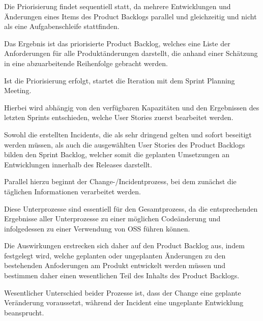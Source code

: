 Die Priorisierung findet sequentiell statt, da mehrere Entwicklungen und Änderungen eines Items des Product Backlogs parallel und gleichzeitig und nicht als eine Aufgabenschleife stattfinden. 

Das Ergebnis ist das priorisierte Product Backlog, welches eine Liste der Anforderungen für alle Produktänderungen darstellt, die anhand einer Schätzung in eine abzuarbeitende Reihenfolge gebracht werden.

Ist die Priorisierung erfolgt, startet die Iteration mit dem Sprint Planning Meeting. 

Hierbei wird abhängig von den verfügbaren Kapazitäten und den Ergebnissen des letzten Sprints entschieden, welche User Stories zuerst bearbeitet werden. 

Sowohl die erstellten Incidents, die als sehr dringend gelten und sofort beseitigt werden müssen, als auch die ausgewählten User Stories des Product Backlogs bilden den Sprint Backlog, welcher somit die geplanten Umsetzungen an Entwicklungen innerhalb des Releases darstellt.

Parallel hierzu beginnt der Change-/Incidentprozess, bei dem zunächst die täglichen Informationen verarbeitet werden. 

Diese Unterprozesse sind essentiell für den Gesamtprozess, da die entsprechenden Ergebnisse aller Unterprozesse zu einer möglichen Codeänderung und infolgedessen zu einer Verwendung von OSS führen können. 

Die Auswirkungen erstrecken sich daher auf den Product Backlog aus, indem festgelegt wird, welche geplanten oder ungeplanten Änderungen zu den bestehenden Anfoderungen am Produkt entwickelt werden müssen und bestimmen daher einen wesentlichen Teil des Inhalts des Product Backlogs.  

Wesentlicher Unterschied beider Prozesse ist, dass der Change eine geplante Veränderung voraussetzt, während der Incident eine ungeplante Entwicklung beansprucht.  

